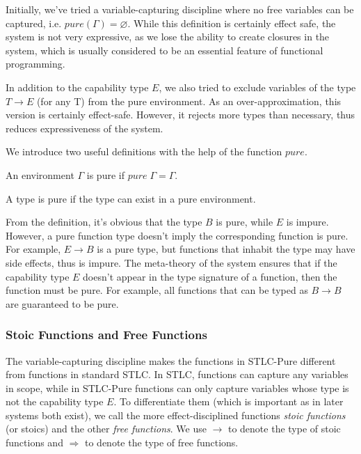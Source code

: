 Initially, we've tried a variable-capturing discipline where no free
variables can be captured, i.e. $pure(\Gamma) = \varnothing$. While
this definition is certainly effect safe, the system is not very
expressive, as we lose the ability to create closures in the system,
which is usually considered to be an essential feature of functional
programming.

In addition to the capability type $E$, we also tried to exclude
variables of the type $T \to E$ (for any T) from the pure
environment. As an over-approximation, this version is certainly
effect-safe. However, it rejects more types than necessary, thus
reduces expressiveness of the system.

We introduce two useful definitions with the help of the function
$pure$.

\begin{definition}
  An environment $\Gamma$ is pure if $pure \; \Gamma = \Gamma$.
\end{definition}

\begin{definition}
  A type is pure if the type can exist in a pure environment.
\end{definition}

From the definition, it's obvious that the type $B$ is pure, while $E$
is impure. However, a pure function type doesn't imply the
corresponding function is pure. For example, $E \to B$ is a pure type,
but functions that inhabit the type may have side effects, thus is
impure. The meta-theory of the system ensures that if the capability
type $E$ doesn't appear in the type signature of a function, then the
function must be pure. For example, all functions that can be typed as
$B \to B$ are guaranteed to be pure.

\subsubsection{Stoic Functions and Free Functions}

The variable-capturing discipline makes the functions in STLC-Pure
different from functions in standard STLC. In STLC, functions can
capture any variables in scope, while in STLC-Pure functions can only
capture variables whose type is not the capability type $E$. To
differentiate them (which is important as in later systems both
exist), we call the more effect-disciplined functions \emph{stoic
  functions} (or stoics) and the other \emph{free functions}. We use
$\to$ to denote the type of stoic functions and $\Rightarrow$ to
denote the type of free functions.

